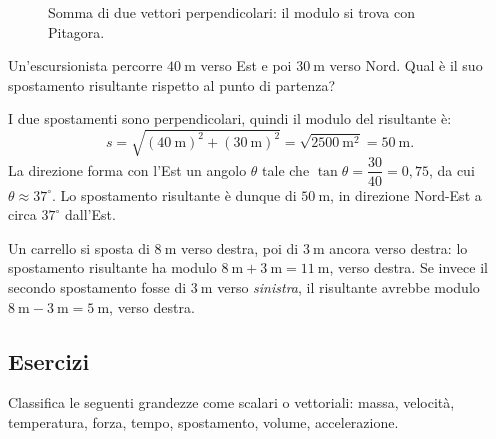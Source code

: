 \begin{figure}[h!]
\centering
{}
\caption{Somma di due vettori perpendicolari: il modulo si trova con Pitagora.}
\label{fig:perpendicolari}
\end{figure}

\begin{testexample}
Un'escursionista percorre $\SI{40}{\meter}$ verso Est e poi $\SI{30}{\meter}$ verso Nord. Qual è il suo spostamento risultante rispetto al punto di partenza?

I due spostamenti sono perpendicolari, quindi il modulo del risultante è:
\[
s = \sqrt{(\SI{40}{\meter})^2 + (\SI{30}{\meter})^2} = \sqrt{\SI{2500}{\meter\squared}} = \SI{50}{\meter}.
\]
La direzione forma con l'Est un angolo $\theta$ tale che $\tan\theta = \dfrac{30}{40} = 0,75$, da cui $\theta \approx 37^\circ$. Lo spostamento risultante è dunque di $\SI{50}{\meter}$, in direzione Nord-Est a circa $37^\circ$ dall'Est.
\end{testexample}

\begin{testexample}
Un carrello si sposta di $\SI{8}{\meter}$ verso destra, poi di $\SI{3}{\meter}$ ancora verso destra: lo spostamento risultante ha modulo $\SI{8}{\meter}+\SI{3}{\meter}=\SI{11}{\meter}$, verso destra. Se invece il secondo spostamento fosse di $\SI{3}{\meter}$ verso \emph{sinistra}, il risultante avrebbe modulo $\SI{8}{\meter}-\SI{3}{\meter}=\SI{5}{\meter}$, verso destra.
\end{testexample}

\subsection{Esercizi}

\begin{esercizio}
Classifica le seguenti grandezze come scalari o vettoriali: massa, velocità, temperatura, forza, tempo, spostamento, volume, accelerazione.\\
\end{esercizio}

